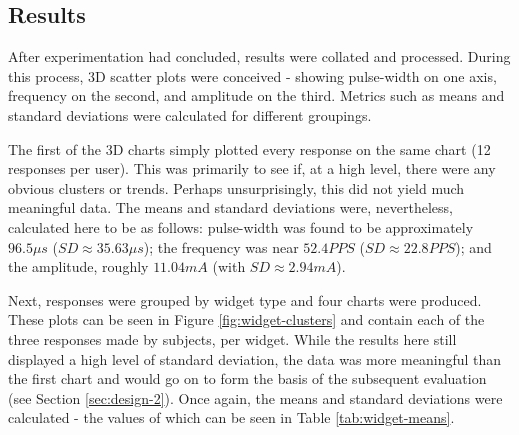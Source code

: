 \documentclass{mpaper}
\begin{document}
\subsection{Results} \label{results-1}
After experimentation had concluded, results were collated and processed. During this process, 3D scatter plots were conceived - showing pulse-width on one axis, frequency on the second, and amplitude on the third. Metrics such as means and standard deviations were calculated for different groupings.

The first of the 3D charts simply plotted every response on the same chart (12 responses per user). This was primarily to see if, at a high level, there were any obvious clusters or trends. Perhaps unsurprisingly, this did not yield much meaningful data. The means and standard deviations were, nevertheless, calculated here to be as follows: pulse-width was found to be approximately $96.5{\mu}s$ ($SD\approx35.63{\mu}s$); the frequency was near $52.4 PPS$ ($SD\approx22.8PPS$); and the amplitude, roughly $11.04mA$ (with $SD\approx2.94mA$).

Next, responses were grouped by widget type and four charts were produced. These plots can be seen in Figure \ref{fig:widget-clusters} and contain each of the three responses made by subjects, per widget. While the results here still displayed a high level of standard deviation, the data was more meaningful than the first chart and would go on to form the basis of the subsequent evaluation (see Section \ref{sec:design-2}). Once again, the means and standard deviations were calculated - the values of which can be seen in Table \ref{tab:widget-means}.
\end{document}
